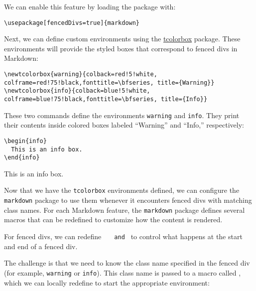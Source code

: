 \documentclass[]{article}
\def\fenceddivclass#1{
  \begin{#1}
  \def\endfence{\end{#1}}
}
\def\markdownRendererFencedDivAttributeContextBegin{
  \begingroup
  \let\markdownRendererAttributeClassName\fenceddivclass
  \def\endfence{}
}
\def\markdownRendererFencedDivAttributeContextEnd{\endfence\endgroup}
\begin{document}
We can enable this feature by loading the package with:

\begin{verbatim}
\usepackage[fencedDivs=true]{markdown}
\end{verbatim}

Next, we can define custom environments using the \href{https://ctan.org/pkg/tcolorbox?lang=en}{tcolorbox} package. These environments will provide the styled boxes that correspond to fenced divs in Markdown:

\begin{verbatim}
\newtcolorbox{warning}{colback=red!5!white, colframe=red!75!black,fonttitle=\bfseries, title={Warning}}
\newtcolorbox{info}{colback=blue!5!white, colframe=blue!75!black,fonttitle=\bfseries, title={Info}}
\end{verbatim}

These two commands define the environments \texttt{warning} and \texttt{info}.  
They print their contents inside colored boxes labeled “Warning” and “Info,” respectively:

\begin{verbatim}
\begin{info}
  This is an info box.
\end{info}
\end{verbatim}

\begin{info}
  This is an info box.
\end{info}

Now that we have the \texttt{tcolorbox} environments defined, we can configure the \texttt{markdown} package to use them whenever it encounters fenced divs with matching class names.  
For each Markdown feature, the \texttt{markdown} package defines several macros that can be redefined to customize how the content is rendered.

For fenced divs, we can redefine  
\texttt{\markdownRendererFencedDivAttributeContextBegin} and  
\texttt{\markdownRendererFencedDivAttributeContextEnd}  
to control what happens at the start and end of a fenced div.

The challenge is that we need to know the class name specified in the fenced div (for example, \texttt{warning} or \texttt{info}).  
This class name is passed to a macro called \texttt{\markdownRendererAttributeClassName}, which we can locally redefine to start the appropriate environment:
\end{document}
